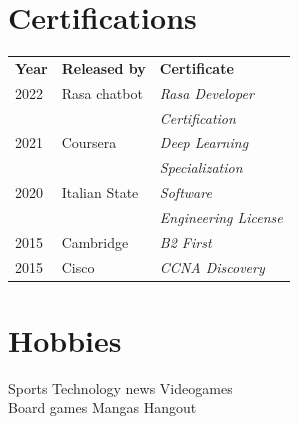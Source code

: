 \documentclass[]{deedy-resume-openfont}
\begin{document}
\begin{minipage}[t]{0.33\textwidth}
\section{Certifications}
\begin{tabular}{@{}lll@{}}
\textbf{Year} & \textbf{Released by} & \textbf{Certificate} \\
2022          & Rasa chatbot  & \textit{Rasa Developer} \\
              &               & \textit{Certification} \\
2021          & Coursera      & \textit{Deep Learning} \\
              &               & \textit{Specialization} \\
2020          & Italian State & \textit{Software}\\
              &               & \textit{Engineering License} \\
2015	      & Cambridge     & \textit{B2 First} \\
2015	      & Cisco         & \textit{CCNA Discovery} \\
\end{tabular}
\sectionsep


\section{Hobbies}
Sports \textbullet{} Technology news \textbullet{} Videogames \\
Board games \textbullet{} Mangas \textbullet{} Hangout

%
%

\end{minipage}
\hfill
\end{document}
